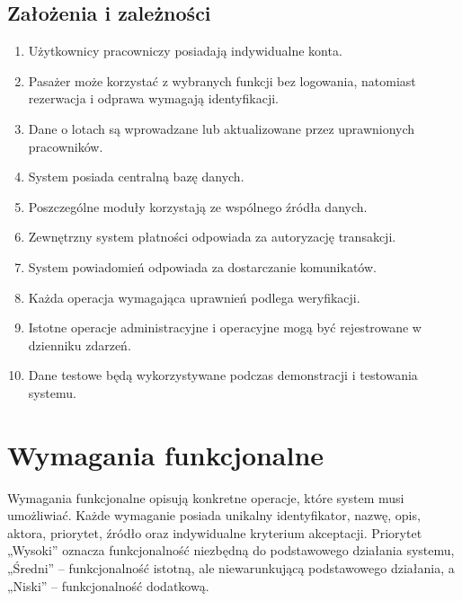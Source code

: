 \documentclass[12pt,a4paper,oneside]{report}
\begin{document}
\section{Założenia i zależności}
\begin{enumerate}
    \item Użytkownicy pracowniczy posiadają indywidualne konta.
    \item Pasażer może korzystać z wybranych funkcji bez logowania, natomiast rezerwacja i odprawa wymagają identyfikacji.
    \item Dane o lotach są wprowadzane lub aktualizowane przez uprawnionych pracowników.
    \item System posiada centralną bazę danych.
    \item Poszczególne moduły korzystają ze wspólnego źródła danych.
    \item Zewnętrzny system płatności odpowiada za autoryzację transakcji.
    \item System powiadomień odpowiada za dostarczanie komunikatów.
    \item Każda operacja wymagająca uprawnień podlega weryfikacji.
    \item Istotne operacje administracyjne i operacyjne mogą być rejestrowane w dzienniku zdarzeń.
    \item Dane testowe będą wykorzystywane podczas demonstracji i testowania systemu.
\end{enumerate}

\chapter{Wymagania funkcjonalne}

Wymagania funkcjonalne opisują konkretne operacje, które system musi umożliwiać. Każde wymaganie posiada unikalny identyfikator, nazwę, opis, aktora, priorytet, źródło oraz indywidualne kryterium akceptacji. Priorytet „Wysoki” oznacza funkcjonalność niezbędną do podstawowego działania systemu, „Średni” -- funkcjonalność istotną, ale niewarunkującą podstawowego działania, a „Niski” -- funkcjonalność dodatkową.
\end{document}
